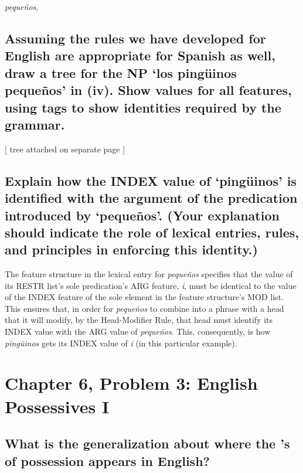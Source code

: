 \documentclass{article}
\begin{document}
\begin{center}
\begin{avm}
\< \textit{peque\~nos}, \pequenos \>
\end{avm}
\end{center}

\subsection{Assuming the rules we have developed for English are appropriate for Spanish as well, draw a tree for the NP `los ping\"uinos peque\~nos' in (iv). Show values for all features, using tags to show identities required by the grammar.}

\begin{center}[ tree attached on separate page ]\end{center}

\subsection{Explain how the INDEX value of `ping\"uinos' is identified with the argument of the predication introduced by `peque\~nos'. (Your explanation should indicate the role of lexical entries, rules, and principles in enforcing this identity.)}

\par{The feature structure in the lexical entry for \textit{peque\~nos} specifies that the value of its {\sc RESTR} list's sole predication's {\sc ARG} feature, \textit{i}, must be identical to the value of the {\sc INDEX} feature of the sole element in the feature structure's {\sc MOD} list. This ensures that, in order for \textit{peque\~nos} to combine into a phrase with a head that it will modify, by the {\sc Head-Modifier Rule}, that head must identify its {\sc INDEX} value with the {\sc ARG} value of \textit{peque\~nos}. This, consequently, is how \textit{ping\"uinos} gets its {\sc INDEX} value of \textit{i} (in this particular example).}

\section{Chapter 6, Problem 3: English Possessives I}

\subsection{What is the generalization about where the 's of possession appears in English?}
\end{document}
